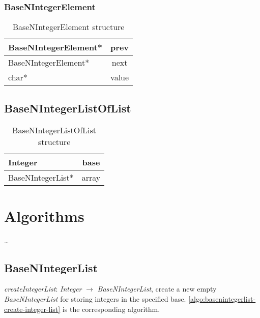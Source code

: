 \documentclass[book, nodocumentinfo]{upmethodology-document}
\begin{document}
\subsection{BaseNIntegerElement}

\begin{table}[h]
    \centering
    \label{tab:basenintegerelement-struct}

    \begin{tabular}{|l|c|}
        \hline
        BaseNIntegerElement* & prev \\
        \hline
        BaseNIntegerElement* & next \\
        \hline
        char* & value \\
        \hline
    \end{tabular}

    \caption{BaseNIntegerElement structure}
\end{table}

\section{BaseNIntegerListOfList}

\begin{table}[h]
    \centering
    \label{tab:basenintegerlistoflist-struct}

    \begin{tabular}{|l|c|}
        \hline
        Integer & base \\
        \hline
        BaseNIntegerList* & array \\
        \hline
    \end{tabular}

    \caption{BaseNIntegerListOfList structure}
\end{table}

\chapter{Algorithms}

…

\section{BaseNIntegerList}

\emph{createIntegerList}: \emph{Integer} \(\rightarrow\) \emph{BaseNIntegerList},
    create a new empty \emph{BaseNIntegerList} for storing integers in the specified base.
    \ref{algo:basenintegerlist-create-integer-list} is the corresponding algorithm.
\end{document}
